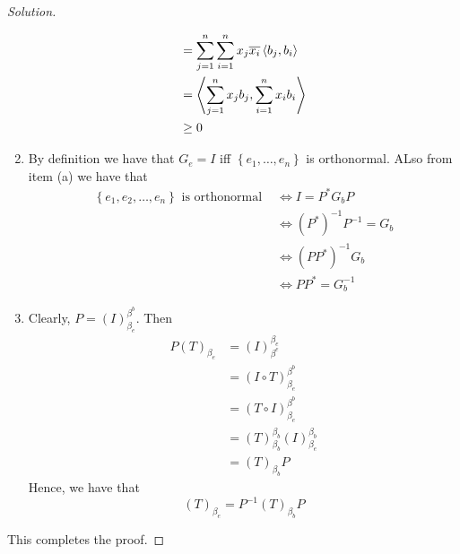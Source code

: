 \begin{proof}[Solution]
\begin{enumerate}[label=(\alph*)]
\begin{align*}
	    &= \sum_{j=1}^{n} \sum_{i=1}^{n} x_{j}\overline{x_{i}} \left\langle b_{j}, b_{i} \right\rangle \\
	    &= \left\langle \sum_{j=1}^{n} x_{j} b_{j}, \sum_{i=1}^{n} x_{i} b_{i} \right\rangle  \\
	    & \ge 0
	\end{align*}
	\item By definition we have that $G_{e} = I$ iff $\left\{ e_{1}, \ldots , e_{n} \right\}$ is orthonormal. ALso from item (a) we have that 
	    \begin{align*}
		\text{$\left\{ e_1 , e_2 , \ldots , e_{n}\right\}$ is orthonormal } &\Leftrightarrow I=P^{*} G_{b} P \\
		& \Leftrightarrow \left( P^{*} \right)^{-1} P^{-1} = G_{b} \\
		& \Leftrightarrow \left( PP^{*} \right)^{-1} G_{b} \\ 
		& \Leftrightarrow PP^{*} = G_{b}^{-1}
	    \end{align*}
	\item Clearly, $P = \left( I \right)_{\beta_{e}}^{\beta ^{b}}$. Then
	    \begin{align*}
		P \left( T \right)_{\beta_{e}} &=  \left( I \right)_{\beta^{e}} ^{\beta_{e}} \\
		&=  \left( I \circ T \right) _{\beta_{e}}^{\beta^{b}} \\
		&= \left( T \circ I \right) _{\beta_{e}}^{\beta^{b}} \\
		&= \left( T \right)_{\beta_{b}}^{\beta_{b}} \left( I \right)_{\beta_{e}}^{\beta_{b}} \\
		&= \left( T \right)_{\beta_{b}} P
	    \end{align*}
	    Hence, we have that 
	    \begin{equation*}
		\left( T \right)_{\beta_e} = P^{-1} \left( T \right)_{\beta_{b}} P
	    \end{equation*}
   \end{enumerate}
   This completes the proof.
\end{proof}
